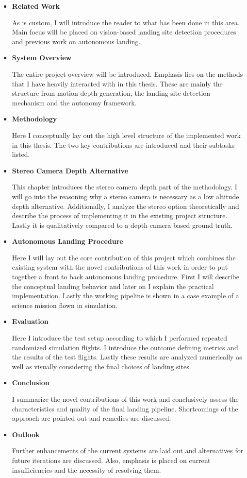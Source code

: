 \begin{itemize}
    \item \textbf{Related Work}

    As is custom, I will introduce the reader to what has been done in this area. Main focus will be placed on vision-based landing site detection procedures and previous work on autonomous landing. 
    \item \textbf{System Overview}

    The entire project overview will be introduced. Emphasis lies on the methods that I have heavily interacted with in this thesis. These are mainly the structure from motion depth generation, the landing site detection mechanism and the autonomy framework.
    \item \textbf{Methodology}

    Here I conceptually lay out the high level structure of the implemented work in this thesis. The two key contributions are introduced and their subtasks listed.

    \item \textbf{Stereo Camera Depth Alternative}

    This chapter introduces the stereo camera depth part of the methodology. I will go into the reasoning why a stereo camera is necessary as a low altitude depth alternative. Additionally, I analyze the stereo option theoretically and describe the process of implementing it in the existing project structure. Lastly it is qualitatively compared to a depth camera based ground truth.
    \item \textbf{Autonomous Landing Procedure}
    
    Here I will lay out the core contribution of this project which combines the existing system with the novel contributions of this work in order to put together a front to back autonomous landing procedure. First I will describe the conceptual landing behavior and later on I explain the practical implementation. Lastly the working pipeline is shown in a case example of a science mission flown in simulation.
    \item \textbf{Evaluation}

    Here I introduce the test setup according to which I performed repeated randomized simulation flights. I introduce the outcome defining metrics and the results of the test flights. Lastly these results are analyzed numerically as well as visually considering the final choices of landing sites.
    \item \textbf{Conclusion}

    I summarize the novel contributions of this work and conclusively assess the characteristics and quality of the final landing pipeline. Shortcomings of the approach are pointed out and remedies are discussed.

    \item \textbf{Outlook}

    Further enhancements of the current systems are laid out and alternatives for future iterations are discussed. Also, emphasis is placed on current insufficiencies and the necessity of resolving them.
\end{itemize}
